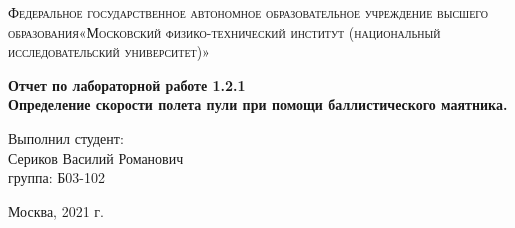 \documentclass[a4paper, 12pt]{article}%
\begin{document}
	\begin{titlepage}
		\begin{center}
			\textsc{Федеральное государственное автономное образовательное учреждение высшего образования«Московский физико-технический институт (национальный исследовательский университет)»\\[5mm]
			}
			
			\vfill
			
			\textbf{Отчет по лабораторной работе 1.2.1\\[3mm]
				Определение скорости полета пули при помощи баллистического маятника.
				\\[50mm]
			}
		\end{center}
		
		\hfill
		\begin{minipage}{.5\textwidth}
			Выполнил студент:\\[2mm] 
			Сериков Василий Романович\\[2mm] 
			группа: Б03-102\\[5mm]
			
		\end{minipage}
		\vfill
		\begin{center}
			Москва, 2021 г.
		\end{center}
	\end{titlepage}
	
\end{document}
